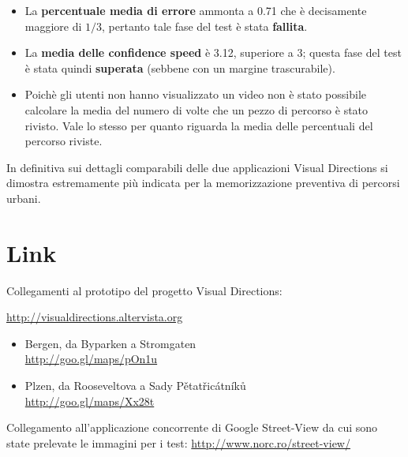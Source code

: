\documentclass[12pt,a4paper,openright, notitlepage]{report}
\begin{document}
\begin{itemize}
	\item La \textbf{percentuale media di errore} ammonta a 0.71 che è decisamente maggiore di $1/3$, pertanto tale fase del test è stata \textbf{fallita}.
	\item La \textbf{media delle confidence speed} è 3.12, superiore a 3; questa fase del test è stata quindi \textbf{superata} (sebbene con un margine trascurabile).
	\item Poichè gli utenti non hanno visualizzato un video non è stato possibile calcolare la media del numero di volte che un pezzo di percorso è stato rivisto. Vale lo stesso per quanto riguarda la media delle percentuali del percorso riviste.
\end{itemize}

In definitiva sui dettagli comparabili delle due applicazioni Visual Directions si dimostra estremamente più indicata per la memorizzazione preventiva di percorsi urbani.

\appendix

\chapter{Link}

Collegamenti al prototipo del progetto Visual Directions: 

\url{http://visualdirections.altervista.org}

\begin{itemize}
	\item Bergen, da Byparken a Stromgaten \\
	\url{http://goo.gl/maps/pOn1u}

	\item Plzen, da Rooseveltova a Sady Pětatřicátníků \\
	\url{http://goo.gl/maps/Xx28t}
\end{itemize}

Collegamento all’applicazione concorrente di Google Street-View da cui sono state prelevate le immagini per i test: \url{http://www.norc.ro/street-view/}




\nocite{*}

\end{document}
